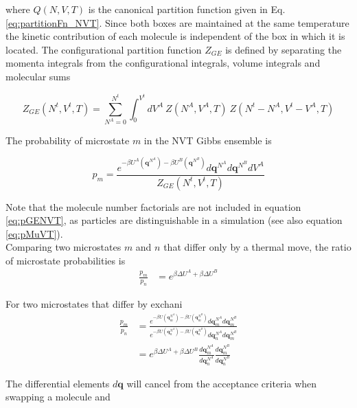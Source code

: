 where $Q(N,V,T)$ is the canonical partition function given in Eq. \ref{eq:partitionFn_NVT}. 
Since both boxes are maintained at the same temperature 
the kinetic contribution of each molecule is independent of the box in which it is located.
The configurational partition function $Z_{GE}$ is defined by separating the momenta integrals 
from the configurational integrals, volume integrals and molecular sums

\begin{equation}
Z_{GE}\left(N^t,V^t,T\right) = \sum^{N^t}_{N{^A}=0} \int^{V^t}_0 dV^A\ Z(N^A,V^A,T)\ Z(N^t-N^A,V^t-V^A,T)
\label{eq:configPartitionFn_GENVT}
\end{equation}

The probability of microstate $m$ in the NVT Gibbs ensemble is

\begin{equation}
p_m = \frac{e^{-\beta U^A \left(\textbf{q}^{N^A}\right) -\beta U^B \left(\textbf{q}^{N^B}\right)} d\textbf{q}^{N^A} d\textbf{q}^{N^B} dV^A}{Z_{GE}(N^t,V^t,T)}
\label{eq:pGENVT}
\end{equation}

Note that the molecule number factorials are not included in equation \ref{eq:pGENVT}, 
as particles are distinguishable in a simulation (see also equation \ref{eq:pMuVT}). \\

Comparing two microstates $m$ and $n$ that differ only by a thermal move, the ratio of microstate probabilities is
\begin{align}
\label{eq:pGENVT_ratio}
\frac{p_m}{p_n}&= e^{\beta \Delta U^A + \beta \Delta U^B}
\end{align}

For two microstates that differ by exchani
\begin{align}
\label{eq:pGENVT_ratio}
\frac{p_m}{p_n} &= \frac{e^{-\beta U\left(\mathbf{q}_m^{N^A}\right) - \beta U\left(\mathbf{q}_m^{N^B}\right)} d\mathbf{q}_m^{N^A} d\mathbf{q}_m^{N^B}}
                        {e^{-\beta U\left(\mathbf{q}_n^{N^A}\right) - \beta U\left(\mathbf{q}_n^{N^B}\right)} d\mathbf{q}_n^{N^A} d\mathbf{q}_m^{N^B}} \nonumber \\
&= e^{\beta \Delta U^A + \beta \Delta U^B} \frac{d\mathbf{q}_m^{N^A}}{d\mathbf{q}_n^{N^A}} \frac{d\mathbf{q}_m^{N^B}}{d\mathbf{q}_n^{N^B}}
\end{align}

The differential elements $d\mathbf{q}$ will cancel from the acceptance criteria when swapping a molecule and 

